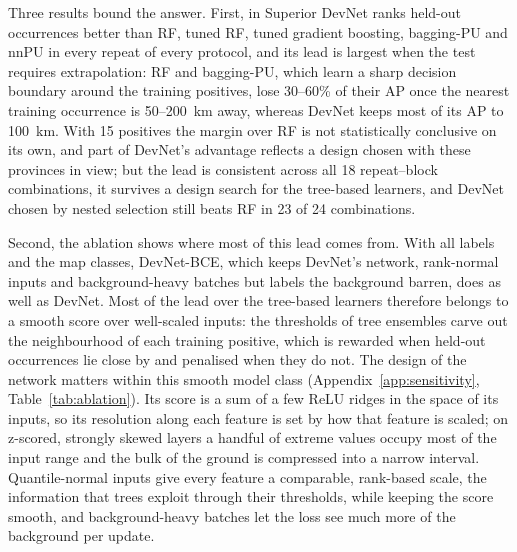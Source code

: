 \documentclass[pdflatex,sn-apa]{sn-jnl}
\begin{document}
Three results bound the answer. First, in Superior DevNet ranks held-out occurrences better than RF, tuned RF, tuned gradient boosting, bagging-PU and nnPU in every repeat of every protocol, and its lead is largest when the test requires extrapolation: RF and bagging-PU, which learn a sharp decision boundary around the training positives, lose 30--60\% of their AP once the nearest training occurrence is 50--200~km away, whereas DevNet keeps most of its AP to 100~km. With 15 positives the margin over RF is not statistically conclusive on its own, and part of DevNet's advantage reflects a design chosen with these provinces in view; but the lead is consistent across all 18 repeat--block combinations, it survives a design search for the tree-based learners, and DevNet chosen by nested selection still beats RF in 23 of 24 combinations.

Second, the ablation shows where most of this lead comes from. With all labels and the map classes, DevNet-BCE, which keeps DevNet's network, rank-normal inputs and background-heavy batches but labels the background barren, does as well as DevNet. Most of the lead over the tree-based learners therefore belongs to a smooth score over well-scaled inputs: the thresholds of tree ensembles carve out the neighbourhood of each training positive, which is rewarded when held-out occurrences lie close by and penalised when they do not. The design of the network matters within this smooth model class (Appendix~\ref{app:sensitivity}, Table~\ref{tab:ablation}). Its score is a sum of a few ReLU ridges in the space of its inputs, so its resolution along each feature is set by how that feature is scaled; on z-scored, strongly skewed layers a handful of extreme values occupy most of the input range and the bulk of the ground is compressed into a narrow interval. Quantile-normal inputs give every feature a comparable, rank-based scale, the information that trees exploit through their thresholds, while keeping the score smooth, and background-heavy batches let the loss see much more of the background per update.
\end{document}
